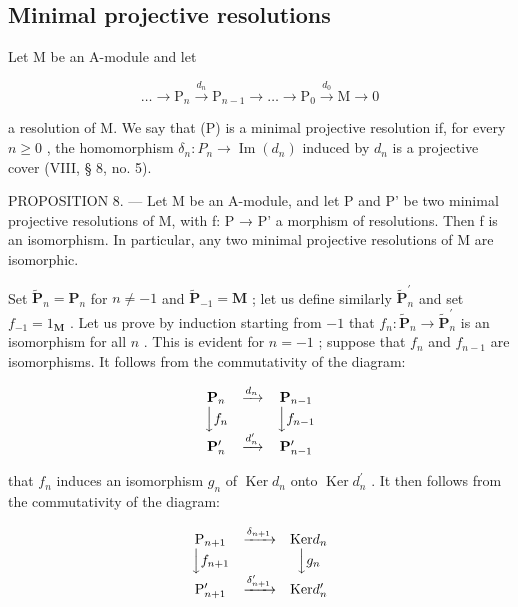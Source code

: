 \subsection{Minimal projective resolutions}

Let M be an A-module and let

\[
\dots \longrightarrow \mathrm{P} _ {n} \xrightarrow {d _ {n}} \mathrm{P} _ {n - 1} \longrightarrow \dots \longrightarrow \mathrm{P} _ {0} \xrightarrow {d _ {0}} \mathrm{M} \longrightarrow 0\tag{P}
\]

a resolution of M. We say that (P) is a minimal projective resolution if, for every \(n \geqslant 0\) , the homomorphism \(\delta_{n}: P_{n} \to \operatorname{Im}(d_{n})\) induced by \(d_{n}\) is a projective cover (VIII, § 8, no. 5).

PROPOSITION 8. — Let M be an A-module, and let P and P' be two minimal projective resolutions of M, with f: P → P' a morphism of resolutions. Then f is an isomorphism. In particular, any two minimal projective resolutions of M are isomorphic.

Set \(\tilde{\mathbf{P}}_{n} = \mathbf{P}_{n}\) for \(n \neq -1\) and \(\tilde{\mathbf{P}}_{-1} = \mathbf{M}\) ; let us define similarly \(\tilde{\mathbf{P}}_{n}^{\prime}\) and set \(f_{-1} = 1_{\mathbf{M}}\) . Let us prove by induction starting from \(-1\) that \(f_{n}: \tilde{\mathbf{P}}_{n} \to \tilde{\mathbf{P}}_{n}^{\prime}\) is an isomorphism for all \(n\) . This is evident for \(n = -1\) ; suppose that \(f_{n}\) and \(f_{n-1}\) are isomorphisms. It follows from the commutativity of the diagram:

\[
\begin{array}{c c c} \mathbf {P} _ {n} & \xrightarrow {d _ {n}} & \mathbf {P} _ {n - 1} \\ \Big \downarrow f _ {n} & & \Big \downarrow f _ {n - 1} \\ \mathbf {P} _ {n} ^ {\prime} & \xrightarrow {d _ {n} ^ {\prime}} & \mathbf {P} _ {n - 1} ^ {\prime} \end{array}
\]

that \(f_{n}\) induces an isomorphism \(g_{n}\) of \(\operatorname{Ker} d_{n}\) onto \(\operatorname{Ker} d_{n}^{\prime}\) . It then follows from the commutativity of the diagram:

\[
\begin{array}{c c c} \mathrm{P} _ {n + 1} & \xrightarrow {\delta_ {n + 1}} & \text {Ker} d _ {n} \\ \Big \downarrow f _ {n + 1} & & \Big \downarrow g _ {n} \\ \mathrm{P} _ {n + 1} ^ {\prime} & \xrightarrow {\delta_ {n + 1} ^ {\prime}} & \text {Ker} d _ {n} ^ {\prime} \end{array}
\]

